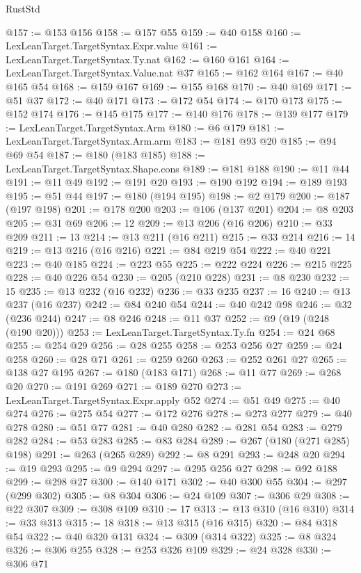 \begin{lexlean}{RustStd}
\begin{coremodule}
@157 := @153 @156
@158 := @157 @55
@159 := @40 @158
@160 := LexLeanTarget.TargetSyntax.Expr.value
@161 := LexLeanTarget.TargetSyntax.Ty.nat
@162 := @160 @161
@164 := LexLeanTarget.TargetSyntax.Value.nat @37
@165 := @162 @164
@167 := @40 @165 @54
@168 := @159 @167
@169 := @155 @168
@170 := @40 @169
@171 := @51 @37
@172 := @40 @171
@173 := @172 @54
@174 := @170 @173
@175 := @152 @174
@176 := @145 @175
@177 := @140 @176
@178 := @139 @177
@179 := LexLeanTarget.TargetSyntax.Arm
@180 := @6 @179
@181 := LexLeanTarget.TargetSyntax.Arm.arm
@183 := @181 @93 @20
@185 := @94 @69 @54
@187 := @180 (@183 @185)
@188 := LexLeanTarget.TargetSyntax.Shape.cons
@189 := @181 @188
@190 := @11 @44
@191 := @11 @49
@192 := @191 @20
@193 := @190 @192
@194 := @189 @193
@195 := @51 @44
@197 := @180 (@194 @195)
@198 := @2 @179
@200 := @187 (@197 @198)
@201 := @178 @200
@203 := @106 (@137 @201)
@204 := @8 @203
@205 := @31 @69
@206 := 12
@209 := @13 @206 (@16 @206)
@210 := @33 @209
@211 := 13
@214 := @13 @211 (@16 @211)
@215 := @33 @214
@216 := 14
@219 := @13 @216 (@16 @216)
@221 := @84 @219 @54
@222 := @40 @221
@223 := @40 @185
@224 := @223 @55
@225 := @222 @224
@226 := @215 @225
@228 := @40 @226 @54
@230 := @205 (@210 @228)
@231 := @8 @230
@232 := 15
@235 := @13 @232 (@16 @232)
@236 := @33 @235
@237 := 16
@240 := @13 @237 (@16 @237)
@242 := @84 @240 @54
@244 := @40 @242 @98
@246 := @32 (@236 @244)
@247 := @8 @246
@248 := @11 @37
@252 := @9 (@19 (@248 (@190 @20)))
@253 := LexLeanTarget.TargetSyntax.Ty.fn
@254 := @24 @68
@255 := @254 @29
@256 := @28 @255
@258 := @253 @256 @27
@259 := @24 @258
@260 := @28 @71
@261 := @259 @260
@263 := @252 @261 @27
@265 := @138 @27 @195
@267 := @180 (@183 @171)
@268 := @11 @77
@269 := @268 @20
@270 := @191 @269
@271 := @189 @270
@273 := LexLeanTarget.TargetSyntax.Expr.apply @52
@274 := @51 @49
@275 := @40 @274
@276 := @275 @54
@277 := @172 @276
@278 := @273 @277
@279 := @40 @278
@280 := @51 @77
@281 := @40 @280
@282 := @281 @54
@283 := @279 @282
@284 := @53 @283
@285 := @83 @284
@289 := @267 (@180 (@271 @285) @198)
@291 := @263 (@265 @289)
@292 := @8 @291
@293 := @248 @20
@294 := @19 @293
@295 := @9 @294
@297 := @295 @256 @27
@298 := @92 @188
@299 := @298 @27
@300 := @140 @171
@302 := @40 @300 @55
@304 := @297 (@299 @302)
@305 := @8 @304
@306 := @24 @109
@307 := @306 @29
@308 := @22 @307
@309 := @308 @109
@310 := 17
@313 := @13 @310 (@16 @310)
@314 := @33 @313
@315 := 18
@318 := @13 @315 (@16 @315)
@320 := @84 @318 @54
@322 := @40 @320 @131
@324 := @309 (@314 @322)
@325 := @8 @324
@326 := @306 @255
@328 := @253 @326 @109
@329 := @24 @328
@330 := @306 @71

\end{coremodule}
\end{lexlean}
